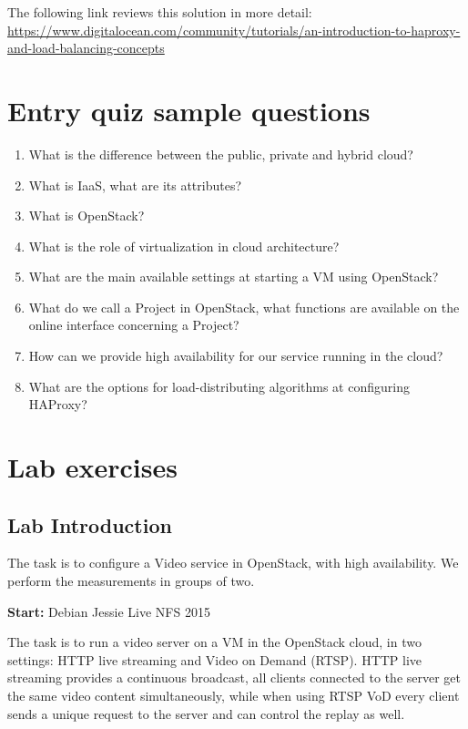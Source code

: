 \documentclass[a4paper]{article}
\begin{document}
The following link reviews this solution in more detail:
\url{https://www.digitalocean.com/community/tutorials/an-introduction-to-haproxy-and-load-balancing-concepts}

\appendix

\section{Entry quiz sample questions}

\begin{enumerate}
    \item What is the difference between the public, private and hybrid cloud?
    \item What is IaaS, what are its attributes?
    \item What is OpenStack?
    \item What is the role of virtualization in cloud architecture?
    \item What are the main available settings at starting a VM using OpenStack?
    \item What do we call a Project in OpenStack, what functions are available on the online interface concerning a
          Project?
    \item How can we provide high availability for our service running in the cloud?
    \item What are the options for load-distributing algorithms at configuring HAProxy?
\end{enumerate}

\section{Lab exercises}

\subsection{Lab Introduction}

The task is to configure a Video service in OpenStack, with high availability. We perform the measurements in groups of
two. 

\noindent{}\textbf{Start:} Debian Jessie Live NFS 2015

\noindent{}The task is to run a video server on a VM in the OpenStack cloud, in two settings: HTTP live streaming
and Video on Demand (RTSP). HTTP live streaming provides a continuous broadcast, all clients connected to the server get
the same video content simultaneously, while when using RTSP VoD every client sends a unique request to the server and can control the
replay as well.
\end{document}
